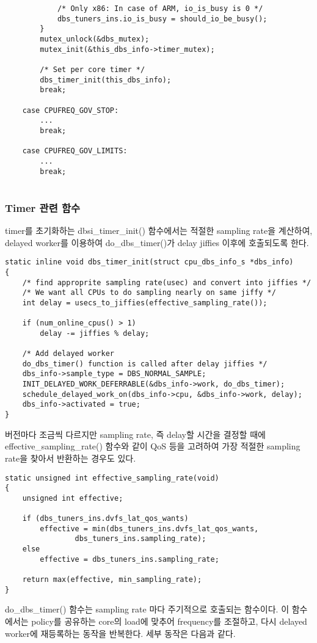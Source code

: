 \begin{lstlisting}
            /* Only x86: In case of ARM, io_is_busy is 0 */
            dbs_tuners_ins.io_is_busy = should_io_be_busy();
        }
        mutex_unlock(&dbs_mutex);
        mutex_init(&this_dbs_info->timer_mutex);

        /* Set per core timer */
        dbs_timer_init(this_dbs_info);
        break;

    case CPUFREQ_GOV_STOP:
        ...
        break;

    case CPUFREQ_GOV_LIMITS:
        ...
        break;


\end{lstlisting}


\subsubsection{Timer 관련 함수}
timer를 초기화하는 dbsi\_timer\_init() 함수에서는 적절한 sampling rate을 계산하여,
delayed worker를 이용하여 do\_dbs\_timer()가 delay jiffies 이후에 호출되도록 한다. 
\begin{lstlisting}
static inline void dbs_timer_init(struct cpu_dbs_info_s *dbs_info)
{
    /* find approprite sampling rate(usec) and convert into jiffies */
    /* We want all CPUs to do sampling nearly on same jiffy */
    int delay = usecs_to_jiffies(effective_sampling_rate());

    if (num_online_cpus() > 1)
        delay -= jiffies % delay;

    /* Add delayed worker
    do_dbs_timer() function is called after delay jiffies */
    dbs_info->sample_type = DBS_NORMAL_SAMPLE;
    INIT_DELAYED_WORK_DEFERRABLE(&dbs_info->work, do_dbs_timer);
    schedule_delayed_work_on(dbs_info->cpu, &dbs_info->work, delay);
    dbs_info->activated = true;
}
\end{lstlisting}

버전마다 조금씩 다르지만 sampling rate, 즉 delay할 시간을 결정할 때에
effective\_sampling\_rate() 함수와 같이 QoS 등을 고려하여 가장 적절한 sampling rate을 찾아서 반환하는 경우도 있다. 
\begin{lstlisting}
static unsigned int effective_sampling_rate(void)
{
    unsigned int effective;

    if (dbs_tuners_ins.dvfs_lat_qos_wants)
        effective = min(dbs_tuners_ins.dvfs_lat_qos_wants,
                dbs_tuners_ins.sampling_rate);
    else
        effective = dbs_tuners_ins.sampling_rate;

    return max(effective, min_sampling_rate);
}
\end{lstlisting}
do\_dbs\_timer() 함수는 sampling rate 마다 주기적으로 호출되는 함수이다. 
이 함수에서는 policy를 공유하는 core의 load에 맞추어 frequency를 조절하고, 
다시 delayed worker에 재등록하는 동작을 반복한다. 세부 동작은 다음과 같다. 

